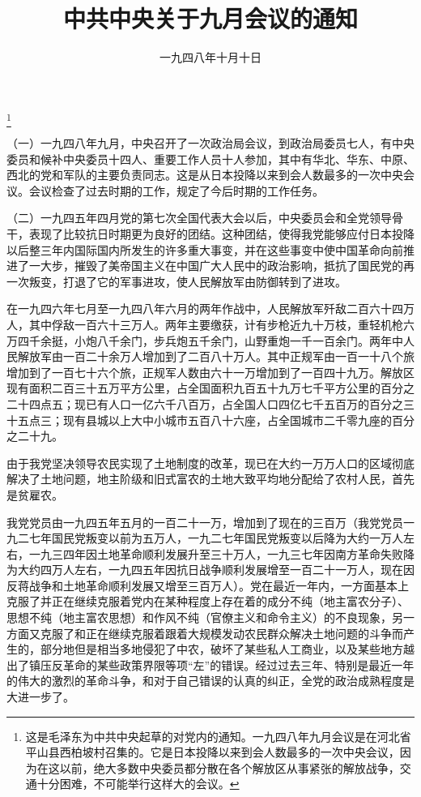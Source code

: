 
\title{中共中央关于九月会议的通知}
\date{一九四八年十月十日}
\thanks{这是毛泽东为中共中央起草的对党内的通知。一九四八年九月会议是在河北省平山县西柏坡村召集的。它是日本投降以来到会人数最多的一次中央会议，因为在这以前，绝大多数中央委员都分散在各个解放区从事紧张的解放战争，交通十分困难，不可能举行这样大的会议。}
\maketitle


（一）一九四八年九月，中央召开了一次政治局会议，到政治局委员七人，有中央委员和候补中央委员十四人、重要工作人员十人参加，其中有华北、华东、中原、西北的党和军队的主要负责同志。这是从日本投降以来到会人数最多的一次中央会议。会议检查了过去时期的工作，规定了今后时期的工作任务。

（二）一九四五年四月党的第七次全国代表大会以后，中央委员会和全党领导骨干，表现了比较抗日时期更为良好的团结。这种团结，使得我党能够应付日本投降以后整三年内国际国内所发生的许多重大事变，并在这些事变中使中国革命向前推进了一大步，摧毁了美帝国主义在中国广大人民中的政治影响，抵抗了国民党的再一次叛变，打退了它的军事进攻，使人民解放军由防御转到了进攻。

在一九四六年七月至一九四八年六月的两年作战中，人民解放军歼敌二百六十四万人，其中俘敌一百六十三万人。两年主要缴获，计有步枪近九十万枝，重轻机枪六万四千余挺，小炮八千余门，步兵炮五千余门，山野重炮一千一百余门。两年中人民解放军由一百二十余万人增加到了二百八十万人。其中正规军由一百一十八个旅增加到了一百七十六个旅，正规军人数由六十一万增加到了一百四十九万。解放区现有面积二百三十五万平方公里，占全国面积九百五十九万七千平方公里的百分之二十四点五；现已有人口一亿六千八百万，占全国人口四亿七千五百万的百分之三十五点三；现有县城以上大中小城市五百八十六座，占全国城市二千零九座的百分之二十九。

由于我党坚决领导农民实现了土地制度的改革，现已在大约一万万人口的区域彻底解决了土地问题，地主阶级和旧式富农的土地大致平均地分配给了农村人民，首先是贫雇农。

我党党员由一九四五年五月的一百二十一万，增加到了现在的三百万（我党党员一九二七年国民党叛变以前为五万人，一九二七年国民党叛变以后降为大约一万人左右，一九三四年因土地革命顺利发展升至三十万人，一九三七年因南方革命失败降为大约四万人左右，一九四五年因抗日战争顺利发展增至一百二十一万人，现在因反蒋战争和土地革命顺利发展又增至三百万人）。党在最近一年内，一方面基本上克服了并正在继续克服着党内在某种程度上存在着的成分不纯（地主富农分子）、思想不纯（地主富农思想）和作风不纯（官僚主义和命令主义）的不良现象，另一方面又克服了和正在继续克服着跟着大规模发动农民群众解决土地问题的斗争而产生的，部分地但是相当多地侵犯了中农，破坏了某些私人工商业，以及某些地方越出了镇压反革命的某些政策界限等项“左”的错误。经过过去三年、特别是最近一年的伟大的激烈的革命斗争，和对于自己错误的认真的纠正，全党的政治成熟程度是大进一步了。

